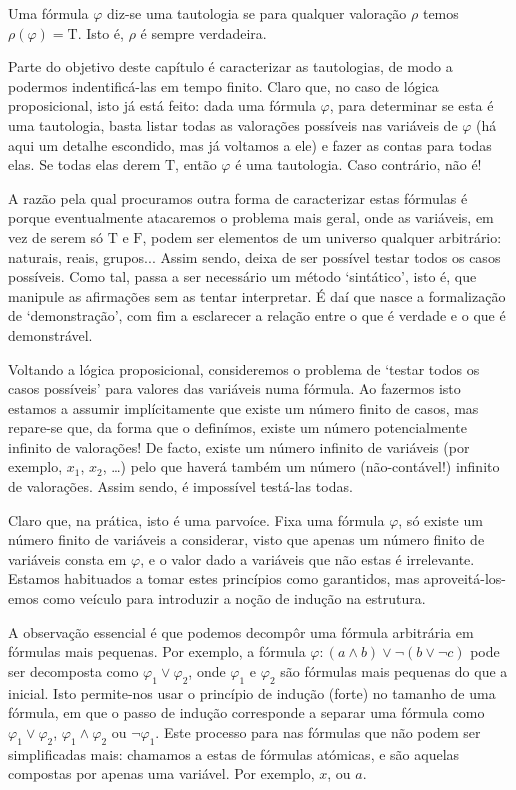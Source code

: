 \documentclass{report}
\theoremstyle{definition}
\theoremstyle{remark}
\newcommand{\lt}{\mathrm{T}}
\newcommand{\lf}{\mathrm{F}}
\begin{document}
	Uma fórmula $\varphi$ diz-se uma tautologia se para qualquer valoração $\rho$ temos $\rho(\varphi) = \lt$. Isto é, $\rho$ é sempre verdadeira.
	
	Parte do objetivo deste capítulo é caracterizar as tautologias, de modo a podermos indentificá-las em tempo finito. Claro que, no caso de lógica proposicional, isto já está feito: dada uma fórmula $\varphi$, para determinar se esta é uma tautologia, basta listar todas as valorações possíveis nas variáveis de $\varphi$ (há aqui um detalhe escondido, mas já voltamos a ele) e fazer as contas para todas elas. Se todas elas derem $\lt$, então $\varphi$ é uma tautologia. Caso contrário, não é!
	
	A razão pela qual procuramos outra forma de caracterizar estas fórmulas é porque eventualmente atacaremos o problema mais geral, onde as variáveis, em vez de serem só $\lt$ e $\lf$, podem ser elementos de um universo qualquer arbitrário: naturais, reais, grupos... Assim sendo, deixa de ser possível testar todos os casos possíveis. Como tal, passa a ser necessário um método `sintático', isto é, que manipule as afirmações sem as tentar interpretar. É daí que nasce a formalização de `demonstração', com fim a esclarecer a relação entre o que é verdade e o que é demonstrável.
	
	Voltando a lógica proposicional, consideremos o problema de `testar todos os casos possíveis' para valores das variáveis numa fórmula. Ao fazermos isto estamos a assumir implícitamente que existe um número finito de casos, mas repare-se que, da forma que o definímos, existe um número potencialmente infinito de valorações! De facto, existe um número infinito de variáveis (por exemplo, $x_1$, $x_2$, \dots) pelo que haverá também um número (não-contável!) infinito de valorações. Assim sendo, é impossível testá-las todas.
	
	Claro que, na prática, isto é uma parvoíce. Fixa uma fórmula $\varphi$, só existe um número finito de variáveis a considerar, visto que apenas um número finito de variáveis consta em $\varphi$, e o valor dado a variáveis que não estas é irrelevante. Estamos habituados a tomar estes princípios como garantidos, mas aproveitá-los-emos como veículo para introduzir a noção de indução na estrutura.
	
	A observação essencial é que podemos decompôr uma fórmula arbitrária em fórmulas mais pequenas. Por exemplo, a fórmula $\varphi : (a \land b) \lor \neg (b \lor \neg c)$ pode ser decomposta como $\varphi_1 \lor \varphi_2$, onde $\varphi_1$ e $\varphi_2$ são fórmulas mais pequenas do que a inicial. Isto permite-nos usar o princípio de indução (forte) no tamanho de uma fórmula, em que o passo de indução corresponde a separar uma fórmula como $\varphi_1 \lor \varphi_2$, $\varphi_1 \land \varphi_2$ ou $\neg \varphi_1$. Este processo para nas fórmulas que não podem ser simplificadas mais: chamamos a estas de fórmulas atómicas, e são aquelas compostas por apenas uma variável. Por exemplo, $x$, ou $a$.
	
\end{document}
